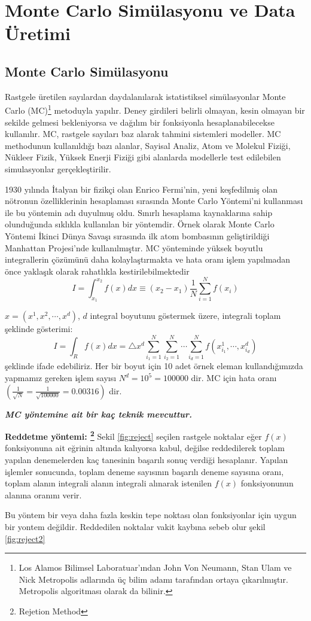 \chapter{Monte Carlo Simülasyonu ve Data Üretimi}
\section{Monte Carlo Simülasyonu}
Rastgele üretilen sayılardan daydalanılarak istatistiksel simülasyonlar Monte Carlo (MC)\footnote{Los Alamos Bilimsel Laboratuar’ından John Von Neumann, Stan Ulam ve Nick Metropolis adlarında üç bilim adamı tarafından ortaya çıkarılmıştır. Metropolis algoritması olarak da bilinir.} metoduyla yapılır. 
Deney girdileri belirli olmayan, kesin olmayan bir sekilde gelmesi bekleniyorsa ve dağılım bir fonksiyonla hesaplanabilecekse kullanılır. MC, rastgele sayıları baz alarak tahmini sistemleri modeller. MC methodunun kullanıldığı bazı alanlar, Sayisal Analiz, Atom ve Molekul Fiziği, Nükleer Fizik, Yüksek Enerji Fiziği gibi alanlarda modellerle test edilebilen simulasyonlar gerçekleştirilir. 
\par 1930 yılında İtalyan bir fizikçi olan Enrico Fermi’nin, yeni keşfedilmiş olan nötronun özelliklerinin hesaplaması sırasında Monte Carlo Yöntemi’ni kullanması ile bu yöntemin adı duyulmuş oldu. Sınırlı hesaplama kaynaklarına sahip olunduğunda sıklıkla kullanılan bir yöntemdir. Örnek olarak Monte Carlo Yöntemi İkinci Dünya Savaşı sırasında ilk atom bombasının geliştirildiği Manhattan Projesi’nde kullanılmıştır. MC yönteminde yüksek boyutlu integrallerin çözümünü daha kolaylaştırmakta ve hata oranı işlem yapılmadan önce yaklaşık olarak rahatlıkla kestirilebilmektedir  
\begin{equation}
I= \int_{x_1}^{x_2} f(x) dx \equiv (x_2 - x_1) \frac{1}{N}\sum_{i=1}^N f(x_i)
\end{equation}
\par $x= (x^1,x^2,\cdots ,x^d)$, $d$ integral boyutunu göstermek üzere, integrali toplam şeklinde gösterimi:
\begin{equation}
I=\int_R f(x) dx = \triangle x^d \sum_{i_1 =1}^N \sum_{i_2 =1}^N \cdots \sum_{i_d =1}^N f(x_{i_1}^1,\cdots,x_{i_d}^d)
\end{equation}
şeklinde ifade edebiliriz. Her bir boyut için 10 adet örnek eleman kullandığımızda yapmamız gereken işlem sayısı $N^d =10^5=100000$ dir. MC için hata oranı $\left(\frac{1}{\sqrt{N}}=\frac{1}{\sqrt{100000}}=0.00316 \right)$ dir.
\par \textbf{\textit{MC yöntemine ait bir kaç teknik mevcuttur.}}
\par \textbf{Reddetme yöntemi: \footnote{Rejetion Method} } Sekil \ref{fig:reject} seçilen rastgele noktalar eğer $f(x)$ fonksiyonuna ait eğrinin altında kalıyorsa kabul, değilse reddedilerek toplam yapılan denemelerden kaç tanesinin başarılı sonuç verdiği hesaplanır. Yapılan işlemler sonucunda, toplam deneme sayısının başarılı deneme sayısına oranı, toplam alanın integrali alanın integrali alınarak istenilen $f(x)$ fonksiyonunun alanına oranını verir.
\par Bu yöntem bir veya daha fazla keskin tepe noktası olan fonksiyonlar için uygun bir yontem değildir. Reddedilen noktalar vakit kaybına sebeb olur şekil \ref{fig:reject2}

